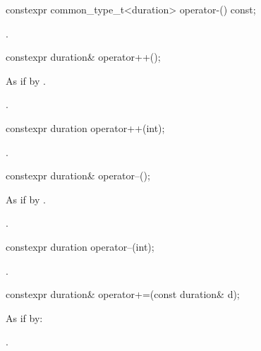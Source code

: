 %
\begin{itemdecl}
constexpr common_type_t<duration> operator-() const;
\end{itemdecl}

\begin{itemdescr}
\pnum
\returns {}.
\end{itemdescr}

%
\begin{itemdecl}
constexpr duration& operator++();
\end{itemdecl}

\begin{itemdescr}
\pnum
\effects As if by .

\pnum
\returns {}.
\end{itemdescr}

%
\begin{itemdecl}
constexpr duration operator++(int);
\end{itemdecl}

\begin{itemdescr}
\pnum
\returns {}.
\end{itemdescr}

%
\begin{itemdecl}
constexpr duration& operator--();
\end{itemdecl}

\begin{itemdescr}
\pnum
\effects As if by .

\pnum
\returns {}.
\end{itemdescr}

%
\begin{itemdecl}
constexpr duration operator--(int);
\end{itemdecl}

\begin{itemdescr}
\pnum
\returns {}.
\end{itemdescr}

%
\begin{itemdecl}
constexpr duration& operator+=(const duration& d);
\end{itemdecl}

\begin{itemdescr}
\pnum
\effects As if by: 

\pnum
\returns {}.
\end{itemdescr}

